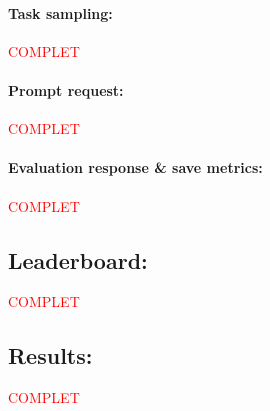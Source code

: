 \paragraph{Task sampling:}
\textcolor{red}{COMPLET}


\paragraph{Prompt request:}
\textcolor{red}{COMPLET}


\paragraph{Evaluation response \& save metrics:}
\textcolor{red}{COMPLET}

\subsection{Leaderboard:}
\textcolor{red}{COMPLET}

\subsection{Results:}
\textcolor{red}{COMPLET}



